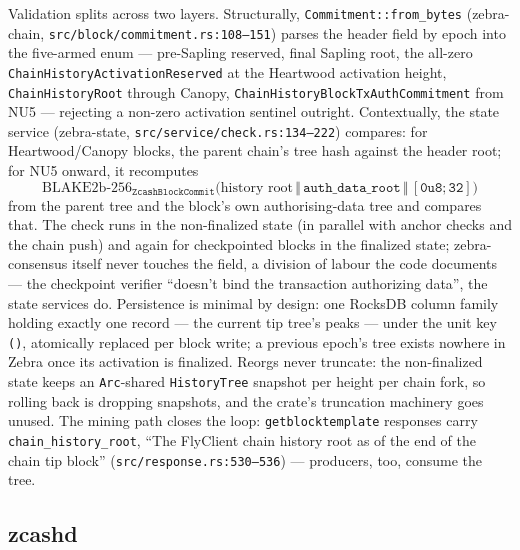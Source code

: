 \documentclass[11pt,a4paper]{article}
\theoremstyle{definition}
\begin{document}
Validation splits across two layers. Structurally,
\texttt{Commitment::from\_bytes} (\textsf{zebra-chain},
\texttt{src/block/commitment.rs:108--151}) parses the header field by
epoch into the five-armed enum --- pre-Sapling reserved, final Sapling
root, the all-zero \texttt{ChainHistory\allowbreak ActivationReserved} at the
Heartwood activation height, \texttt{ChainHistoryRoot} through Canopy,
\texttt{ChainHistory\allowbreak BlockTxAuthCommitment} from NU5 --- rejecting a
non-zero activation sentinel outright. Contextually, the state service
(\textsf{zebra-state}, \texttt{src/service/check.rs:134--222}) compares:
for Heartwood/Canopy blocks, the parent chain's tree hash against the
header root; for NU5 onward, it recomputes
\[
\mathrm{BLAKE2b\text{-}256}_{\mathtt{ZcashBlockCommit}}\bigl(
\text{history root} \,\Vert\, \texttt{auth\_data\_root} \,\Vert\,
\mathtt{[0u8;32]}\bigr)
\]
from the parent tree and the block's own authorising-data tree and
compares that. The check runs in the non-finalized state (in parallel
with anchor checks and the chain push) and again for checkpointed blocks
in the finalized state; \textsf{zebra-consensus} itself never touches
the field, a division of labour the code documents --- the checkpoint
verifier ``doesn't bind the transaction authorizing data'', the state
services do. Persistence is minimal by design: one RocksDB column family
holding exactly one record --- the current tip tree's peaks --- under
the unit key \texttt{()}, atomically replaced per block write; a
previous epoch's tree exists nowhere in Zebra once its activation is
finalized. Reorgs never truncate: the non-finalized state keeps an
\texttt{Arc}-shared \texttt{HistoryTree} snapshot per height per chain
fork, so rolling back is dropping snapshots, and the crate's
truncation machinery goes unused. The mining path closes the loop:
\texttt{getblocktemplate} responses carry
\texttt{chain\_history\_root}, ``The FlyClient chain history root as of
the end of the chain tip block'' (\texttt{src/response.rs:530--536}) ---
producers, too, consume the tree.

\subsection{zcashd}\label{sec:fc-zcashd}
\end{document}
